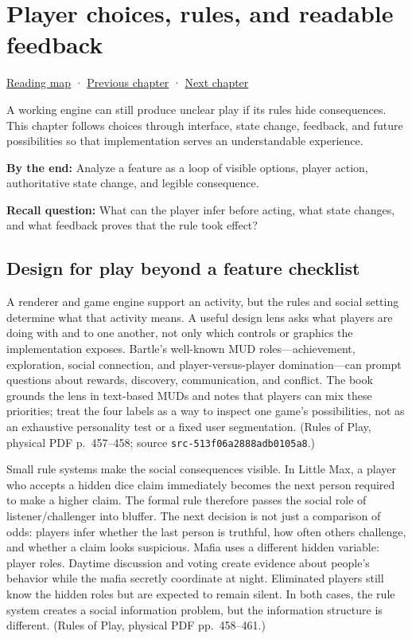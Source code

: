 \chapter{Player choices, rules, and readable feedback}\label{05-engine-i-ch009-player-choices-rules-and-readable-feedback}\hypertarget{05-engine-i-ch009}{}\label{stagechapter:05-engine-i-ch009}

\hyperref[volume-reading-map]{Reading map} · \hyperref[05-engine-i-ch008-algorithms-application-boundaries-and-a-first-playable]{Previous chapter} · \hyperref[05-engine-i-ch010-engine-changes-across-subsystem-contracts]{Next chapter}

A working engine can still produce unclear play if its rules hide consequences. This chapter follows choices through interface, state change, feedback, and future possibilities so that implementation serves an understandable experience.

\textbf{By the end:} Analyze a feature as a loop of visible options, player action, authoritative state change, and legible consequence.

\textbf{Recall question:} What can the player infer before acting, what state changes, and what feedback proves that the rule took effect?

\section{Design for play beyond a feature checklist}\label{05-engine-i-ch009-design-for-play-beyond-a-feature-checklist}

A renderer and game engine support an activity, but the rules and social setting determine what that activity means. A useful design lens asks what players are doing with and to one another, not only which controls or graphics the implementation exposes. Bartle's well-known MUD roles---achievement, exploration, social connection, and player-versus-player domination---can prompt questions about rewards, discovery, communication, and conflict. The book grounds the lens in text-based MUDs and notes that players can mix these priorities; treat the four labels as a way to inspect one game's possibilities, not as an exhaustive personality test or a fixed user segmentation. (Rules of Play, physical PDF p.~457--458; source \texttt{src-513f06a2888adb0105a8}.)

Small rule systems make the social consequences visible. In Little Max, a player who accepts a hidden dice claim immediately becomes the next person required to make a higher claim. The formal rule therefore passes the social role of listener/challenger into bluffer. The next decision is not just a comparison of odds: players infer whether the last person is truthful, how often others challenge, and whether a claim looks suspicious. Mafia uses a different hidden variable: player roles. Daytime discussion and voting create evidence about people's behavior while the mafia secretly coordinate at night. Eliminated players still know the hidden roles but are expected to remain silent. In both cases, the rule system creates a social information problem, but the information structure is different. (Rules of Play, physical PDF pp.~458--461.)

